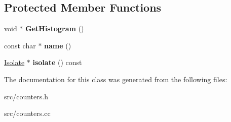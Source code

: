 \subsection*{Protected Member Functions}
\begin{DoxyCompactItemize}
\item 
\hypertarget{classv8_1_1internal_1_1_histogram_a64814df2fbed982aab10659a38645a4c}{}void $\ast$ {\bfseries Get\+Histogram} ()\label{classv8_1_1internal_1_1_histogram_a64814df2fbed982aab10659a38645a4c}

\item 
\hypertarget{classv8_1_1internal_1_1_histogram_a22b3415f2c6489eb208ae2f742061e6c}{}const char $\ast$ {\bfseries name} ()\label{classv8_1_1internal_1_1_histogram_a22b3415f2c6489eb208ae2f742061e6c}

\item 
\hypertarget{classv8_1_1internal_1_1_histogram_aa26e393fdf6c7d2016ab312727cd68b9}{}\hyperlink{classv8_1_1internal_1_1_isolate}{Isolate} $\ast$ {\bfseries isolate} () const \label{classv8_1_1internal_1_1_histogram_aa26e393fdf6c7d2016ab312727cd68b9}

\end{DoxyCompactItemize}


The documentation for this class was generated from the following files\+:\begin{DoxyCompactItemize}
\item 
src/counters.\+h\item 
src/counters.\+cc\end{DoxyCompactItemize}
